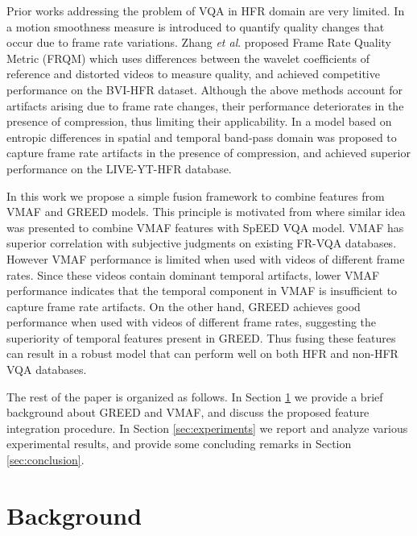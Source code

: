 \documentclass[conference]{IEEEtran}
\newcommand{\etal}{\textit{et al}. }
\begin{document}
Prior works addressing the problem of VQA in HFR domain are very limited. In \cite{nasiri2018temporal} a motion smoothness measure is introduced to quantify quality changes that occur due to frame rate variations. Zhang \etal \cite{zhang2017frame} proposed Frame Rate Quality Metric (FRQM) which uses differences between the wavelet coefficients of reference and distorted videos to measure quality, and achieved competitive performance on the BVI-HFR dataset. Although the above methods account for artifacts arising due to frame rate changes, their performance deteriorates in the presence of compression, thus limiting their applicability. In \cite{madhusudana2020stgreed} a model based on entropic differences in spatial and temporal band-pass domain was proposed to capture frame rate artifacts in the presence of compression, and achieved superior performance on the LIVE-YT-HFR database.

In this work we propose a simple fusion framework to combine features from VMAF \cite{VMAF2016} and GREED \cite{madhusudana2020stgreed} models. This principle is motivated from \cite{bampis2018spatiotemporal} where similar idea was presented to combine VMAF features with SpEED \cite{bampis2017speed} VQA model. VMAF has superior correlation with subjective judgments on existing FR-VQA databases. However VMAF performance is limited when used with videos of different frame rates. Since these videos contain dominant temporal artifacts, lower VMAF performance indicates that the temporal component in VMAF is insufficient to capture frame rate artifacts. On the other hand, GREED achieves good performance when used with videos of different frame rates, suggesting the superiority of temporal features present in GREED. Thus fusing these features can result in a robust model that can perform well on both HFR and non-HFR VQA databases. 

The rest of the paper is organized as follows. In Section \ref{sec:GREED} we provide a brief background about GREED and VMAF, and discuss the proposed feature integration procedure. In Section \ref{sec:experiments} we report and analyze various experimental results, and provide some concluding remarks in Section \ref{sec:conclusion}.

\section{Background}
\label{sec:GREED}
\end{document}
